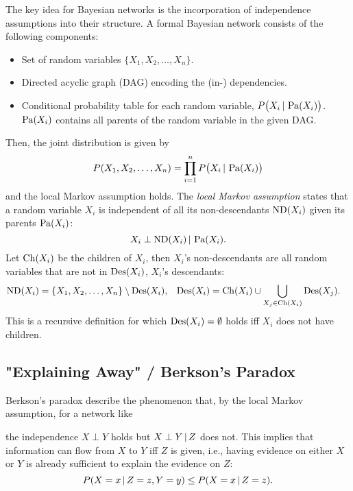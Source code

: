 		The key idea for Bayesian networks is the incorporation of independence assumptions into their structure. A formal Bayesian network consists of the following components:
		\begin{itemize}
			\item Set of random variables \( \{ X_1, X_2, \dots, X_n \} \).
			\item Directed acyclic graph (DAG) encoding the (in-) dependencies.
			\item Conditional probability table for each random variable, \( P\bigl( X_i \,\vert\, \operatorname{Pa}(X_i) \bigr) \). \( \operatorname{Pa}(X_i) \) contains all parents of the random variable in the given DAG.
		\end{itemize}
		Then, the joint distribution is given by
		\begin{equation}
			P(X_1, X_2, \dots, X_n) = \prod_{i = 1}^{n} P\bigl( X_i \,\vert\, \operatorname{Pa}(X_i) \bigr)  \label{eq:bayesNetJoint}
		\end{equation}
		and the local Markov assumption holds. The \emph{local Markov assumption} states that a random variable \(X_i\) is independent of all its non-descendants \( \operatorname{ND}(X_i) \) given its parents \( \operatorname{Pa}(X_i) \):
		\begin{equation}
			X_i \perp \operatorname{ND}(X_i) \,\vert\, \operatorname{Pa}(X_i).
		\end{equation}
		Let \( \operatorname{Ch}(X_i) \) be the children of \(X_i\), then \(X_i\)'s non-descendants are all random variables that are not in \( \operatorname{Des}(X_i) \), \(X_i\)'s descendants:
		\begin{align}
			\operatorname{ND}(X_i)  & = \{ X_1, X_2, \dots, X_n \} \setminus \operatorname{Des}(X_i),     &
			\operatorname{Des}(X_i) & = \operatorname{Ch}(X_i) \cup \bigcup_{X_j \in \operatorname{Ch}(X_i)} \operatorname{Des}(X_j).
		\end{align}
		This is a recursive definition for which \( \operatorname{Des}(X_i) = \emptyset \) holds iff \( X_i \) does not have children.

		\subsection{"Explaining Away" / Berkson's Paradox}
			\label{subsec:berkson}

			Berkson's paradox describe the phenomenon that, by the local Markov assumption, for a network like
			\begin{center}
			\end{center}
			the independence \( X \perp Y \) holds but \( X \perp Y \,\vert\, Z \) does not. This implies that information can flow from \(X\) to \(Y\) iff \(Z\) is given, i.e., having evidence on either \(X\) or \(Y\) is already sufficient to explain the evidence on \(Z\):
			\begin{equation}
				P(X = x \,\vert\, Z = z, Y = y) \leq P(X = x \,\vert\, Z = z).
			\end{equation}

